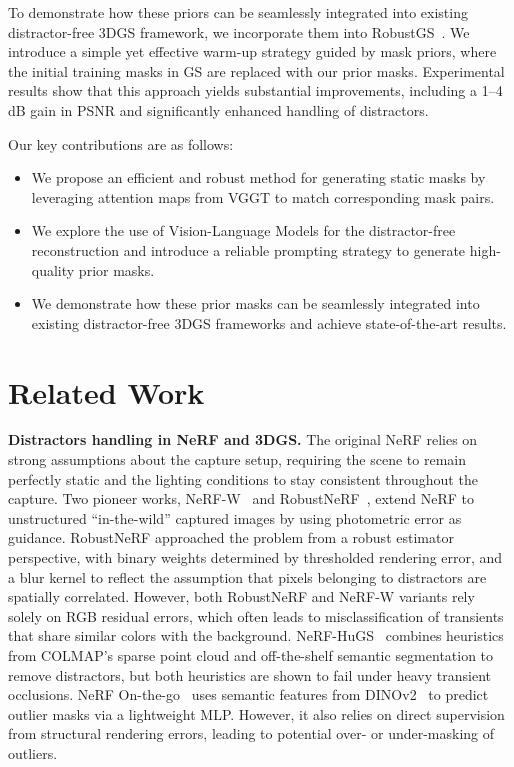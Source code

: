 \documentclass[letterpaper, 10 pt, conference]{ieeeconf}  %
\begin{document}
To demonstrate how these priors can be seamlessly integrated into existing distractor-free 3DGS framework, we incorporate them into RobustGS~\cite{ungermann2024robust}. We introduce a simple yet effective warm-up strategy guided by mask priors, where the initial training masks in GS are replaced with our prior masks. Experimental results show that this approach yields substantial improvements, including a 1–4 dB gain in PSNR and significantly enhanced handling of distractors.

Our key contributions are as follows:
\begin{itemize}
    \item We propose an efficient and robust method for generating static masks by leveraging attention maps from VGGT to match corresponding mask pairs.
    \item We explore the use of Vision-Language Models for the distractor-free reconstruction and introduce a reliable prompting strategy to generate high-quality prior masks.
    \item We demonstrate how these prior masks can be seamlessly integrated into existing distractor-free 3DGS frameworks and achieve state-of-the-art results.
\end{itemize}


\section{Related Work}
\noindent
\textbf{Distractors handling in NeRF and 3DGS.} The original NeRF \cite{mildenhall2021nerf} relies on strong assumptions about the capture setup, requiring the scene to remain perfectly static and the lighting conditions to stay consistent throughout the capture. Two pioneer works, NeRF-W~\cite{martin2021nerf} and RobustNeRF~\cite{sabour2023robustnerf}, extend NeRF to unstructured ``in-the-wild'' captured images by using photometric error as guidance. RobustNeRF approached the problem from a robust estimator perspective, with binary weights determined by thresholded rendering error, and a blur kernel to reflect the assumption that pixels belonging to distractors are spatially correlated. However, both RobustNeRF and NeRF-W variants rely solely on RGB residual errors, which often leads to misclassification of transients that share similar colors with the background. NeRF-HuGS~\cite{chen2024nerf} combines heuristics from COLMAP’s sparse point cloud and off-the-shelf semantic segmentation to remove distractors, but both heuristics are shown to fail under heavy transient occlusions. NeRF On-the-go~\cite{Ren2024NeRF} uses semantic features from DINOv2~\cite{oquab2024dinov2} to predict outlier masks via a lightweight MLP. However, it also relies on direct supervision from structural rendering errors, leading to potential over- or under-masking of outliers. 
\end{document}
